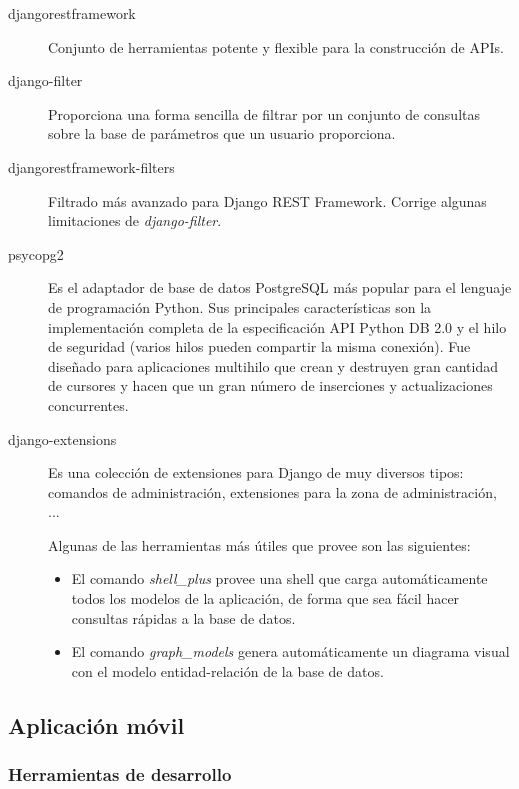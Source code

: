 \begin{description}
\item[djangorestframework] Conjunto de herramientas potente y flexible para la
  construcción de APIs.\cite{django-rest-framework}

\item[django-filter] Proporciona una forma sencilla de filtrar por un conjunto
  de consultas sobre la base de parámetros que un usuario
  proporciona.\cite{django-filter}
  
\item[djangorestframework-filters] Filtrado más avanzado para Django REST
  Framework. Corrige algunas limitaciones de
  \textit{django-filter}.\cite{django-rest-framework-filters}
  
\item[psycopg2] Es el adaptador de base de datos PostgreSQL más popular para el
  lenguaje de programación Python. Sus principales características son la
  implementación completa de la especificación API Python DB 2.0 y el hilo de
  seguridad (varios hilos pueden compartir la misma conexión). Fue diseñado para
  aplicaciones multihilo que crean y destruyen gran cantidad de cursores y
  hacen que un gran número de inserciones y actualizaciones
  concurrentes.\cite{psycopg2}

\item[django-extensions] Es una colección de extensiones para Django de muy
  diversos tipos: comandos de administración, extensiones para la zona de
  administración, ...\cite{django-extensions}
  
  Algunas de las herramientas más útiles que provee son las siguientes:
  \begin{itemize}
  \item El comando \textit{shell\_plus} provee una shell que carga automáticamente
    todos los modelos de la aplicación, de forma que sea fácil hacer consultas
    rápidas a la base de datos.
  \item El comando \textit{graph\_models} genera automáticamente un diagrama
    visual con el modelo entidad-relación de la base de datos.
  \end{itemize}
\end{description}


\subsection{Aplicación móvil}

\subsubsection{Herramientas de desarrollo}

